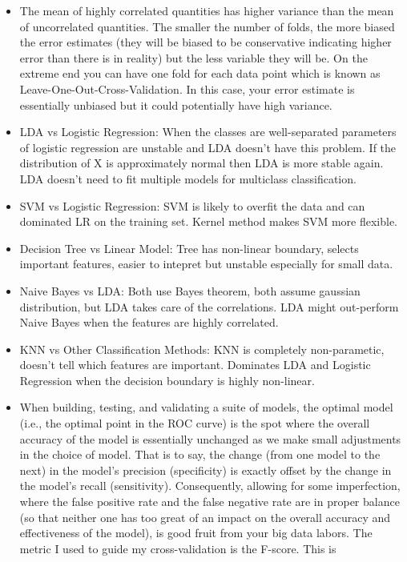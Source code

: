 \documentclass[]{book}
\theoremstyle{definition}
\theoremstyle{definition}
\theoremstyle{definition}
\theoremstyle{remark}
\begin{document}
\begin{itemize}
\item
  The mean of highly correlated quantities has higher variance than the
  mean of uncorrelated quantities. The smaller the number of folds, the
  more biased the error estimates (they will be biased to be
  conservative indicating higher error than there is in reality) but the
  less variable they will be. On the extreme end you can have one fold
  for each data point which is known as Leave-One-Out-Cross-Validation.
  In this case, your error estimate is essentially unbiased but it could
  potentially have high variance.
\item
  LDA vs Logistic Regression: When the classes are well-separated
  parameters of logistic regression are unstable and LDA doesn't have
  this problem. If the distribution of X is approximately normal then
  LDA is more stable again. LDA doesn't need to fit multiple models for
  multiclass classification.
\item
  SVM vs Logistic Regression: SVM is likely to overfit the data and can
  dominated LR on the training set. Kernel method makes SVM more
  flexible.
\item
  Decision Tree vs Linear Model: Tree has non-linear boundary, selects
  important features, easier to intepret but unstable especially for
  small data.
\item
  Naive Bayes vs LDA: Both use Bayes theorem, both assume gaussian
  distribution, but LDA takes care of the correlations. LDA might
  out-perform Naive Bayes when the features are highly correlated.
\item
  KNN vs Other Classification Methods: KNN is completely non-parametic,
  doesn't tell which features are important. Dominates LDA and Logistic
  Regression when the decision boundary is highly non-linear.
\item
  When building, testing, and validating a suite of models, the optimal
  model (i.e., the optimal point in the ROC curve) is the spot where the
  overall accuracy of the model is essentially unchanged as we make
  small adjustments in the choice of model. That is to say, the change
  (from one model to the next) in the model's precision (specificity) is
  exactly offset by the change in the model's recall (sensitivity).
  Consequently, allowing for some imperfection, where the false positive
  rate and the false negative rate are in proper balance (so that
  neither one has too great of an impact on the overall accuracy and
  effectiveness of the model), is good fruit from your big data labors.
  The metric I used to guide my cross-validation is the F-score. This is

\end{itemize}
\end{document}
